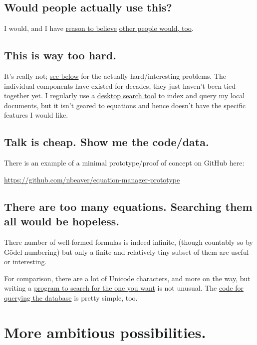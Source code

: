 \documentclass[12pt,letterpaper]{article}
\begin{document}
\subsection{Would people actually use this?}

I would, and I have
\href{http://www.researchgate.net/post/I_am_looking_for_an_equation_database_or_digital_list_of_equations}
{reason to believe}
\href{http://productforums.google.com/forum/#!topic/websearch/lVJiyCSl-xk}
{other people would, too}.

\subsection{This is way too hard.}

It's really not;
\hyperref[sec:ambitious]
{see below} for the actually hard/interesting problems.
The individual components have existed for decades,
they just haven't been tied together yet.
I regularly use a
\href{https://en.wikipedia.org/wiki/Recoll}
{desktop search tool} to index and query my local documents,
but it isn't geared to equations and hence doesn't have the specific features I would like.

\subsection{Talk is cheap. Show me the code/data.}

There is an example of a minimal prototype/proof of concept on GitHub here:

\url{https://github.com/nbeaver/equation-manager-prototype}

\subsection{There are too many equations. Searching them all would be hopeless.}

There number of well-formed formulas is indeed infinite,
(though countably so by Gödel numbering)
but only a finite and relatively tiny subset of them are useful or interesting.

For comparison,
there are a lot of Unicode characters,
and more on the way,
but writing a
\href{https://mail.python.org/pipermail/python-announce-list/2003-April/002183.html}
{program to search for the one you want} is not unusual.
The
\href{http://sources.debian.net/src/unicode/0.9.7/unicode}
{code for querying the database} is pretty simple, too.

\section{More ambitious possibilities.}\label{sec:ambitious}
\end{document}
